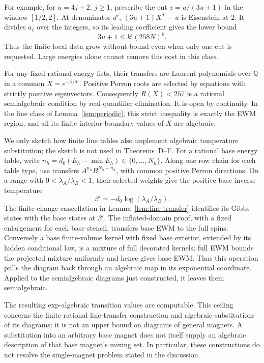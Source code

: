 For example, for \(u=4j+2\), \(j\ge1\), prescribe the cut \(z=u/(3u+1)\) in the window \([1/2,2]\). At denominator \(d'\), \((3u+1)X^{d'}-u\) is Eisenstein at \(2\). It divides \(a_\ell\) over the integers, so its leading coefficient gives the lower bound
\[
3u+1\le k!(258N)^k.
\]
Thus the finite local data grow without bound even when only one cut is requested. Large energies alone cannot remove this cost in this class.

For any fixed rational energy lists, their transfers are Laurent polynomials over \(\mathbb Q\) in a common \(X=e^{-\beta/d'}\). Positive Perron roots are selected by equations with strictly positive eigenvectors. Consequently \(R(X)<257\) is a rational semialgebraic condition by real quantifier elimination. It is open by continuity. In the line class of Lemma~\ref{lem:periodic}, this strict inequality is exactly the EWM region, and all its finite interior boundary values of \(X\) are algebraic.

We only sketch how finite line tables also implement algebraic temperature substitution; the sketch is not used in Theorems~D--F. For a rational base energy table, write \(n_h=d_0(E_h-\min E_h)\in\{0,\ldots,N_h\}\). Along one row chain for each table type, use transfers \(A^{n_h}B^{N_h-n_h}\), with common positive Perron directions. On a range with \(0<\lambda_A/\lambda_B<1\), their selected weights give the positive base inverse temperature
\[
\beta'=-d_0\log(\lambda_A/\lambda_B).
\]
The finite-change cancellation in Lemma~\ref{lem:line-transfer} identifies its Gibbs states with the base states at \(\beta'\). The inflated-domain proof, with a fixed enlargement for each base stencil, transfers base EWM to the full spins. Conversely a base finite-volume kernel with fixed base exterior, extended by its hidden conditional law, is a mixture of full decorated kernels; full EWM bounds the projected mixture uniformly and hence gives base EWM. Thus this operation pulls the diagram back through an algebraic map in its exponential coordinate. Applied to the semialgebraic diagrams just constructed, it leaves them semialgebraic.

The resulting exp-algebraic transition values are computable. This ceiling concerns the finite rational line-transfer construction and algebraic substitutions of its diagrams; it is not an upper bound on diagrams of general magnets. A substitution into an arbitrary base magnet does not itself supply an algebraic description of that base magnet's mixing set. In particular, these constructions do not resolve the single-magnet problem stated in the discussion.
